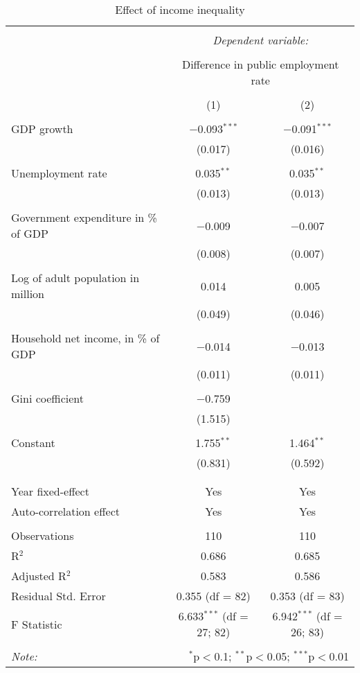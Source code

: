 
\begin{table}[!htbp] \centering 
  \caption{Effect of income inequality} 
  \label{} 
\begin{tabular}{@{\extracolsep{5pt}}lcc} 
\\[-1.8ex]\hline 
\hline \\[-1.8ex] 
 & \multicolumn{2}{c}{\textit{Dependent variable:}} \\ 
\cline{2-3} 
\\[-1.8ex] & \multicolumn{2}{c}{Difference in public employment rate} \\ 
\\[-1.8ex] & (1) & (2)\\ 
\hline \\[-1.8ex] 
 GDP growth & $-$0.093$^{***}$ & $-$0.091$^{***}$ \\ 
  & (0.017) & (0.016) \\ 
  & & \\ 
 Unemployment rate & 0.035$^{**}$ & 0.035$^{**}$ \\ 
  & (0.013) & (0.013) \\ 
  & & \\ 
 Government expenditure in \% of GDP & $-$0.009 & $-$0.007 \\ 
  & (0.008) & (0.007) \\ 
  & & \\ 
 Log of adult population in million & 0.014 & 0.005 \\ 
  & (0.049) & (0.046) \\ 
  & & \\ 
 Household net income, in \% of GDP & $-$0.014 & $-$0.013 \\ 
  & (0.011) & (0.011) \\ 
  & & \\ 
 Gini coefficient & $-$0.759 &  \\ 
  & (1.515) &  \\ 
  & & \\ 
 Constant & 1.755$^{**}$ & 1.464$^{**}$ \\ 
  & (0.831) & (0.592) \\ 
  & & \\ 
\hline \\[-1.8ex] 
Year fixed-effect & Yes & Yes \\ 
Auto-correlation effect & Yes & Yes \\ 
\hline \\[-1.8ex] 
Observations & 110 & 110 \\ 
R$^{2}$ & 0.686 & 0.685 \\ 
Adjusted R$^{2}$ & 0.583 & 0.586 \\ 
Residual Std. Error & 0.355 (df = 82) & 0.353 (df = 83) \\ 
F Statistic & 6.633$^{***}$ (df = 27; 82) & 6.942$^{***}$ (df = 26; 83) \\ 
\hline 
\hline \\[-1.8ex] 
\textit{Note:}  & \multicolumn{2}{r}{$^{*}$p$<$0.1; $^{**}$p$<$0.05; $^{***}$p$<$0.01} \\ 
\end{tabular} 
\end{table} 
